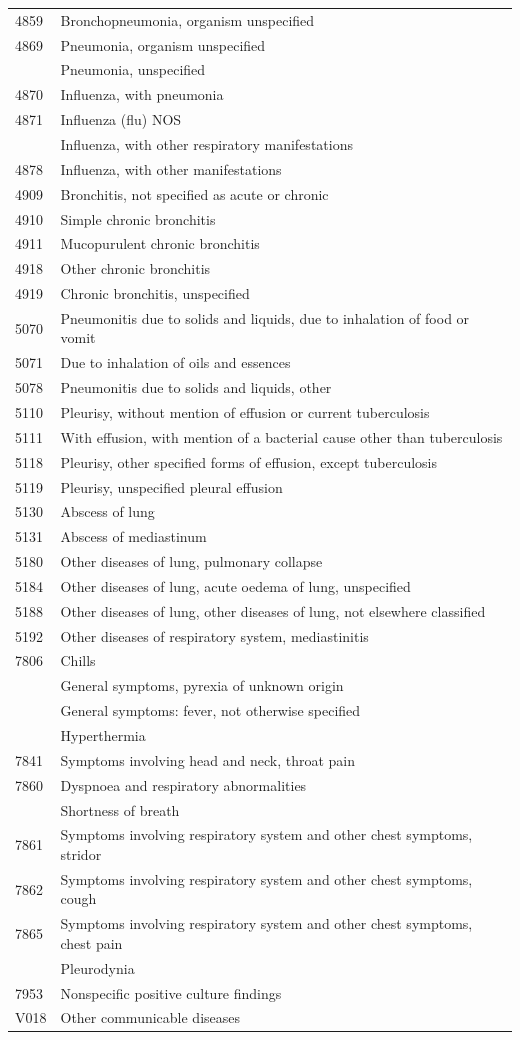\documentclass[]{article}\usepackage[]{graphicx}\usepackage[]{color}
\begin{document}
\begin{longtable}{ll}
4859&Bronchopneumonia, organism unspecified\tabularnewline
4869&Pneumonia, organism unspecified\tabularnewline
&Pneumonia, unspecified\tabularnewline
4870&Influenza, with pneumonia\tabularnewline
4871&Influenza (flu) NOS\tabularnewline
&Influenza, with other respiratory manifestations\tabularnewline
4878&Influenza, with other manifestations\tabularnewline
4909&Bronchitis, not specified as acute or chronic\tabularnewline
4910&Simple chronic bronchitis\tabularnewline
4911&Mucopurulent chronic bronchitis\tabularnewline
4918&Other chronic bronchitis\tabularnewline
4919&Chronic bronchitis, unspecified\tabularnewline
5070&Pneumonitis due to solids and liquids, due to inhalation of food or vomit\tabularnewline
5071&Due to inhalation of oils and essences\tabularnewline
5078&Pneumonitis due to solids and liquids, other\tabularnewline
5110&Pleurisy, without mention of effusion or current tuberculosis\tabularnewline
5111&With effusion, with mention of a bacterial cause other than tuberculosis\tabularnewline
5118&Pleurisy, other specified forms of effusion, except tuberculosis\tabularnewline
5119&Pleurisy, unspecified pleural effusion\tabularnewline
5130&Abscess of lung\tabularnewline
5131&Abscess of mediastinum\tabularnewline
5180&Other diseases of lung, pulmonary collapse\tabularnewline
5184&Other diseases of lung, acute oedema of lung, unspecified\tabularnewline
5188&Other diseases of lung, other diseases of lung, not elsewhere classified\tabularnewline
5192&Other diseases of respiratory system, mediastinitis\tabularnewline
7806&Chills\tabularnewline
&General symptoms, pyrexia of unknown origin\tabularnewline
&General symptoms: fever, not otherwise specified\tabularnewline
&Hyperthermia\tabularnewline
7841&Symptoms involving head and neck, throat pain\tabularnewline
7860&Dyspnoea and respiratory abnormalities\tabularnewline
\newpage
&Shortness of breath\tabularnewline
7861&Symptoms involving respiratory system and other chest symptoms, stridor\tabularnewline
7862&Symptoms involving respiratory system and other chest symptoms, cough\tabularnewline
7865&Symptoms involving respiratory system and other chest symptoms, chest pain\tabularnewline
&Pleurodynia\tabularnewline
7953&Nonspecific positive culture findings\tabularnewline
V018&Other communicable diseases\tabularnewline
\hline
\end{longtable}
\end{document}
